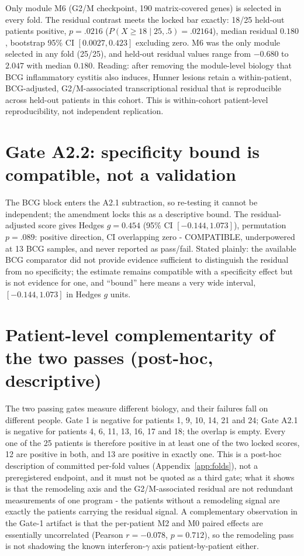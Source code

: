 \documentclass[11pt,a4paper]{article}
\begin{document}
Only module M6 (G2/M checkpoint, 190 matrix-covered genes) is selected in every
fold. The residual contrast meets the locked bar exactly: 18/25 held-out
patients positive, $p=.0216$ ($P(X\geq18\mid25,.5)=.02164$), median residual
$0.180$, bootstrap 95\% CI $[0.0027,0.423]$ excluding zero.
M6 was the only module selected in any fold (25/25), and held-out residual
values range from $-0.680$ to $2.047$ with median $0.180$. Reading: after
removing the module-level biology that BCG inflammatory cystitis also induces,
Hunner lesions retain a within-patient, BCG-adjusted, G2/M-associated
transcriptional residual that is reproducible across held-out patients in this
cohort. This is within-cohort patient-level reproducibility, not independent
replication.

\section{Gate A2.2: specificity bound is compatible, not a validation}
The BCG block enters the A2.1 subtraction, so re-testing it cannot be
independent; the amendment locks this as a descriptive bound. The
residual-adjusted score gives Hedges $g=0.454$ (95\% CI $[-0.144,1.073]$),
permutation $p=.089$: positive direction, CI overlapping zero - COMPATIBLE,
underpowered at 13 BCG samples, and never reported as pass/fail. Stated
plainly: the available BCG comparator did not provide evidence sufficient to
distinguish the residual from no specificity; the estimate remains compatible
with a specificity effect but is not evidence for one, and ``bound'' here
means a very wide interval, $[-0.144,1.073]$ in Hedges $g$ units.

\section{Patient-level complementarity of the two passes (post-hoc, descriptive)}
The two passing gates measure different biology, and their failures fall on
different people. Gate 1 is negative for patients 1, 9, 10, 14, 21 and 24;
Gate A2.1 is negative for patients 4, 6, 11, 13, 16, 17 and 18; the overlap is
empty. Every one of the 25 patients is therefore positive in at least one of
the two locked scores, 12 are positive in both, and 13 are positive in exactly
one. This is a post-hoc description of committed per-fold values
(Appendix~\ref{app:folds}), not a preregistered endpoint, and it must not be
quoted as a third gate; what it shows is that the remodeling axis and the
G2/M-associated residual are not redundant measurements of one program - the
patients without a remodeling signal are exactly the patients carrying the
residual signal. A complementary observation in the Gate-1 artifact is that the
per-patient M2 and M0 paired effects are essentially uncorrelated
(Pearson $r=-0.078$, $p=0.712$), so the remodeling pass is not shadowing the
known interferon-$\gamma$ axis patient-by-patient either.
\end{document}
